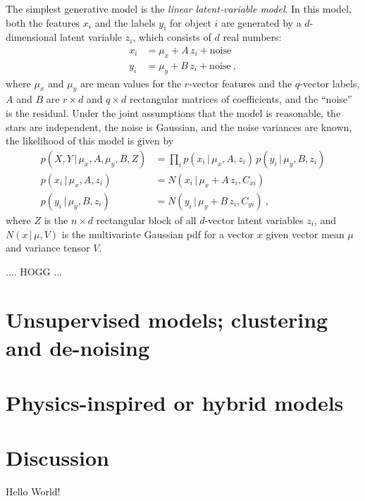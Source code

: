 \documentclass[modern]{aastex631}
\newcommand{\given}{\,|\,}
\begin{document}
The simplest generative model is the \emph{linear latent-variable model}.
In this model, both the features $x_i$ and the labels $y_i$ for object $i$ are generated by a $d$-dimensional latent variable $z_i$, which consists of $d$ real numbers:
\begin{align}
  x_i &= \mu_x + A\,z_i + \mbox{noise} \\
  y_i &= \mu_y + B\,z_i + \mbox{noise} ~,
\end{align}
where $\mu_x$ and $\mu_y$ are mean values for the $r$-vector features and the $q$-vector labels,
$A$ and $B$ are $r\times d$ and $q\times d$ rectangular matrices of coefficients,
and the ``noise'' is the residual.
Under the joint assumptions that the model is reasonable, the stars are independent, the noise is Gaussian, and the noise variances are known, the likelihood of this model is given by
\begin{align}
  p(X, Y\given \mu_x, A, \mu_y, B, Z) &= \prod_i p(x_i\given \mu_x, A, z_i)\,p(y_i\given \mu_y, B, z_i) \\
  p(x_i\given \mu_x, A, z_i) &= N(x_i\given \mu_x + A\,z_i, C_{xi}) \\
  p(y_i\given \mu_y, B, z_i) &= N(y_i\given \mu_y + B\,z_i, C_{yi}) ~,
\end{align}
where $Z$ is the $n\times d$ rectangular block of all $d$-vector latent variables $z_i$,
and $N(x\given\mu,V)$ is the multivariate Gaussian pdf for a vector $x$ given vector mean $\mu$ and variance tensor $V$.

.... HOGG ...

\section{Unsupervised models; clustering and de-noising}

\section{Physics-inspired or hybrid models}

\section{Discussion}

Hello World!

{}

\end{document}
